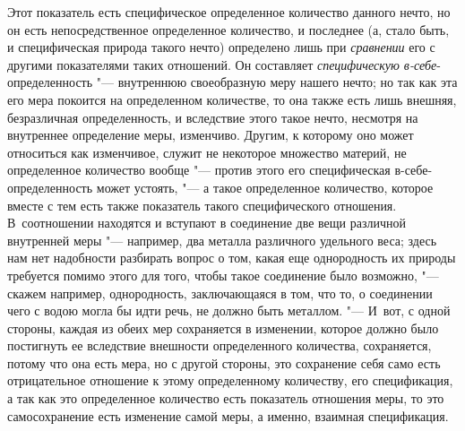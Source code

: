 Этот показатель есть специфическое определенное количество данного нечто, но он
есть непосредственное определенное количество, и последнее (а, стало быть, и
специфическая природа такого нечто) определено лишь при {\em сравнении} его с
другими показателями таких отношений. Он составляет {\em специфическую
в-себе}-определенность "--- внутреннюю своеобразную меру нашего нечто; но так
как эта его мера покоится на определенном количестве, то она также есть лишь
внешняя, безразличная определенность, и вследствие этого такое нечто, несмотря
на внутреннее определение меры, изменчиво. Другим, к которому оно может
относиться как изменчивое, служит не некоторое множество материй, не
определенное количество вообще "--- против этого его специфическая
в-себе-определенность может устоять, "--- а такое определенное количество,
которое вместе с тем есть также показатель такого специфического отношения.
В~соотношении находятся и вступают в соединение две вещи различной внутренней
меры "--- например, два металла различного удельного веса; здесь нам нет
надобности разбирать вопрос о том, какая еще однородность их природы требуется
помимо этого для того, чтобы такое соединение было возможно, "--- скажем
например, однородность, заключающаяся в том, что то, о соединении чего с водою
могла бы идти речь, не должно быть металлом. "--- И~вот, с одной стороны,
каждая из обеих мер сохраняется в изменении, которое должно было постигнуть ее
вследствие внешности определенного количества, сохраняется, потому что она есть
мера, но с другой стороны, это сохранение себя само есть отрицательное
отношение к этому определенному количеству, его спецификация, а так как это
определенное количество есть показатель отношения меры, то это самосохранение
есть изменение самой меры, а именно, взаимная спецификация.

